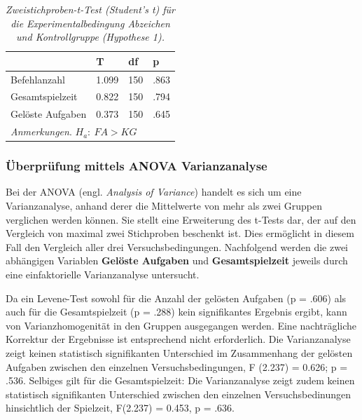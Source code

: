\begin{table}[htbp]
\centering
\caption{\textit{Zweistichproben-t-Test (Student's t) für die Experimentalbedingung Abzeichen und Kontrollgruppe (Hypothese 1).}}
\begin{tabular}{  p{4cm} p{2.0cm} p{2.0cm} p{2.0cm}  }
 \hline
 & T &df & p \\
 \hline
  Befehlanzahl       & 1.099   &   150 & .863\\
  Gesamtspielzeit    & 0.822   &   150 & .794\\
  Gelöste Aufgaben   & 0.373   &   150 & .645\\
 \hline
 \multicolumn{4}{l}{%
 \small%
\textit{Anmerkungen}. $H_a:\: FA > KG$
}\\
\end{tabular}
\label{ttest_hypo_2}
\end{table}





\subsubsection{Überprüfung mittels ANOVA Varianzanalyse }
Bei der ANOVA (engl. \textit{Analysis of Variance}) handelt es sich um eine Varianzanalyse, anhand derer die Mittelwerte von mehr als zwei Gruppen verglichen werden können. Sie stellt eine Erweiterung des t-Tests dar, der auf den Vergleich von maximal zwei Stichproben beschenkt ist. Dies ermöglicht in diesem Fall den Vergleich aller drei Versuchsbedingungen. Nachfolgend werden die zwei abhängigen Variablen \textbf{Gelöste Aufgaben} und \textbf{Gesamtspielzeit} jeweils durch eine einfaktorielle Varianzanalyse untersucht.

Da ein Levene-Test sowohl für die Anzahl der gelösten Aufgaben (p = .606) als auch für die Gesamtspielzeit (p = .288) kein signifikantes Ergebnis ergibt, kann von Varianzhomogenität in den Gruppen ausgegangen werden. Eine nachträgliche Korrektur der Ergebnisse ist entsprechend nicht erforderlich. Die Varianzanalyse zeigt keinen statistisch signifikanten Unterschied im Zusammenhang der gelösten Aufgaben zwischen den einzelnen Versuchsbedingungen, F (2.237) = 0.626; p = .536. Selbiges gilt für die Gesamtspielzeit: Die Varianzanalyse zeigt zudem keinen statistisch  signifikanten Unterschied zwischen den einzelnen Versuchsbedinungen hinsichtlich der Spielzeit,  F(2.237) = 0.453, p = .636.


